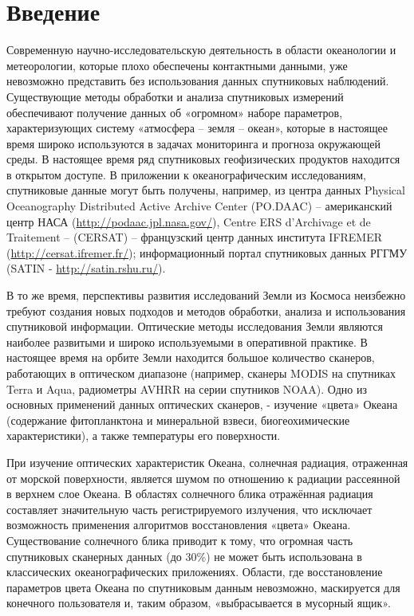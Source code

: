 \chapter*{Введение}							%


Современную научно-исследовательскую деятельность в области океанологии и метеорологии, которые плохо обеспечены контактными данными, уже невозможно представить без использования данных спутниковых наблюдений. Существующие методы обработки и анализа спутниковых измерений обеспечивают получение данных об «огромном» наборе параметров, характеризующих систему «атмосфера -- земля -- океан», которые в настоящее время широко используются в задачах мониторинга и прогноза окружающей среды. В настоящее время ряд спутниковых геофизических продуктов находится в открытом доступе. В приложении к океанографическим исследованиям, спутниковые данные могут быть получены, например, из центра данных Physical Oceanography Distributed Active Archive Center (PO.DAAC) -- американский центр НАСА (\url{http://podaac.jpl.nasa.gov/}), Centre ERS d'Archivage et de Traitement -- (CERSAT) -- французский центр данных института IFREMER (\url{http://cersat.ifremer.fr/}); информационный портал спутниковых данных РГГМУ (SATIN - \url{http://satin.rshu.ru/}).

В то же время, перспективы развития исследований Земли из Космоса неизбежно требуют создания новых подходов и методов обработки, анализа и использования спутниковой информации. Оптические методы исследования Земли являются наиболее развитыми и широко используемыми в оперативной практике. В настоящее время на орбите Земли находится большое количество сканеров, работающих в оптическом диапазоне (например, сканеры MODIS на спутниках Terra и Aqua, радиометры AVHRR на серии спутников NOAA). Одно из основных применений данных оптических сканеров, - изучение «цвета» Океана (содержание фитопланктона и минеральной взвеси, биогеохимические характеристики), а также температуры его поверхности.

При изучение оптических характеристик Океана, солнечная радиация, отраженная от морской поверхности, является шумом по отношению к радиации рассеянной в верхнем слое Океана. В областях солнечного блика отражённая радиация составляет значительную часть регистрируемого излучения, что исключает возможность применения алгоритмов восстановления «цвета» Океана. Существование солнечного блика приводит к тому, что огромная часть спутниковых сканерных данных (до 30\%) не может быть использована в классических океанографических приложениях. Области, где восстановление параметров цвета Океана по спутниковым данным невозможно, маскируется для конечного пользователя и, таким образом, «выбрасывается в мусорный ящик».

